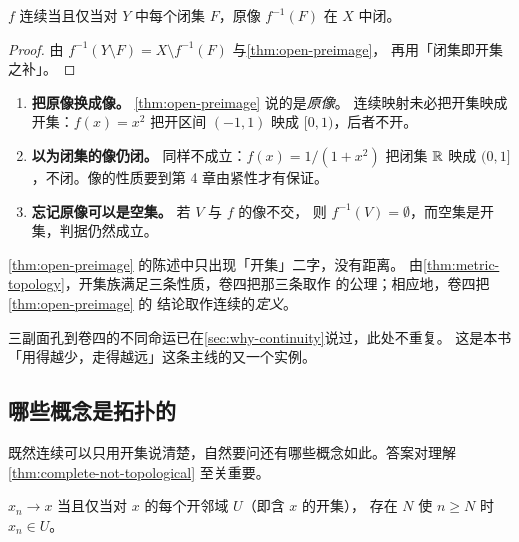 \begin{corollary}
  \label{cor:closed-preimage}
  \(f\) 连续当且仅当对 \(Y\) 中每个闭集 \(F\)，原像 \(f^{-1}(F)\) 在 \(X\) 中闭。
\end{corollary}

\begin{proof}
  由 \(f^{-1}(Y \setminus F) = X \setminus f^{-1}(F)\) 与\cref{thm:open-preimage}，
  再用「闭集即开集之补」。
\end{proof}

\begin{pitfall}
  \begin{enumerate}[label=(\arabic*), leftmargin=1.6em]
    \item \textbf{把原像换成像。} \cref{thm:open-preimage} 说的是\emph{原像}。
          连续映射未必把开集映成开集：\(f(x)=x^{2}\) 把开区间 \((-1,1)\)
          映成 \([0,1)\)，后者不开。
    \item \textbf{以为闭集的像仍闭。} 同样不成立：\(f(x)=1/(1+x^{2})\)
          把闭集 \(\mathbb{R}\) 映成 \((0,1]\)，不闭。像的性质要到第 4 章由紧性才有保证。
    \item \textbf{忘记原像可以是空集。} 若 \(V\) 与 \(f\) 的像不交，
          则 \(f^{-1}(V)=\emptyset\)，而空集是开集，判据仍然成立。
  \end{enumerate}
\end{pitfall}

\begin{remark}[通往卷四的门]
  \cref{thm:open-preimage} 的陈述中只出现「开集」二字，没有距离。
  由\cref{thm:metric-topology}，开集族满足三条性质，卷四把那三条取作%
  的公理；相应地，卷四把\cref{thm:open-preimage} 的
  结论取作连续的\emph{定义}。

  三副面孔到卷四的不同命运已在\cref{sec:why-continuity}说过，此处不重复。
  这是本书「用得越少，走得越远」这条主线的又一个实例。
\end{remark}

\subsection*{哪些概念是拓扑的}

既然连续可以只用开集说清楚，自然要问还有哪些概念如此。答案对理解%
\cref{thm:complete-not-topological} 至关重要。

\begin{proposition}
  \label{prop:convergence-topological}
  \(x_{n} \to x\) 当且仅当对 \(x\) 的每个开邻域 \(U\)（即含 \(x\) 的开集），
  存在 \(N\) 使 \(n \ge N\) 时 \(x_{n} \in U\)。
\end{proposition}

